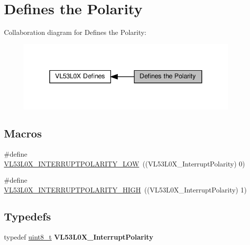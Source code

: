 \hypertarget{group__VL53L0X__define__InterruptPolarity__group}{}\section{Defines the Polarity}
\label{group__VL53L0X__define__InterruptPolarity__group}
Collaboration diagram for Defines the Polarity\+:\nopagebreak
\begin{figure}[H]
\begin{center}
\leavevmode
\includegraphics[width=312pt]{group__VL53L0X__define__InterruptPolarity__group}
\end{center}
\end{figure}
\subsection*{Macros}
\begin{DoxyCompactItemize}
\item 
\#define \hyperlink{group__VL53L0X__define__InterruptPolarity__group_ga67bf93a2c17680cc6ffcdd6834de1359}{V\+L53\+L0\+X\+\_\+\+I\+N\+T\+E\+R\+R\+U\+P\+T\+P\+O\+L\+A\+R\+I\+T\+Y\+\_\+\+L\+OW}~((V\+L53\+L0\+X\+\_\+\+Interrupt\+Polarity)    0)
\item 
\#define \hyperlink{group__VL53L0X__define__InterruptPolarity__group_gae0e72bee296015e468adcbb70db057d4}{V\+L53\+L0\+X\+\_\+\+I\+N\+T\+E\+R\+R\+U\+P\+T\+P\+O\+L\+A\+R\+I\+T\+Y\+\_\+\+H\+I\+GH}~((V\+L53\+L0\+X\+\_\+\+Interrupt\+Polarity)    1)
\end{DoxyCompactItemize}
\subsection*{Typedefs}
\begin{DoxyCompactItemize}
\item 
\mbox{\label{group__VL53L0X__define__InterruptPolarity__group_ga2e3d6ac26e194574e08b27eee33922b5}} 
typedef \hyperlink{vl53l0x__types_8h_aba7bc1797add20fe3efdf37ced1182c5}{uint8\+\_\+t} {\bfseries V\+L53\+L0\+X\+\_\+\+Interrupt\+Polarity}
\end{DoxyCompactItemize}


